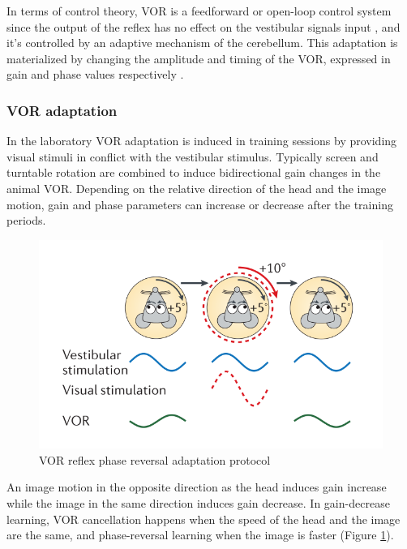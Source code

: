 \documentclass[12pt, a4paper,twoside]{tesi_upf}
\begin{document}
In terms of control theory, VOR is a feedforward or open-loop control system since the output of the reflex has no effect on the vestibular signals input \cite{Porrill2007}, and it's controlled by an adaptive mechanism of the cerebellum. This adaptation is materialized by changing the amplitude and timing of the VOR, expressed in gain and phase values respectively \cite{DeZeeuw2005}.

\subsubsection{VOR adaptation}

In the laboratory VOR adaptation is induced in training sessions by providing visual stimuli in conflict with the vestibular stimulus. Typically screen and turntable rotation are combined to induce bidirectional gain changes in the animal VOR. Depending on the relative direction of the head and the image motion, gain and phase parameters can increase or decrease after the training periods.

\begin{figure}
  \centering
  \includegraphics[scale=0.50]{images/vor_adaptation.png}
  \caption[VOR reflex phase reversal adaptation protocol]{VOR reflex phase reversal adaptation protocol \cite{Gao2012a}}
  \label{fig:voradaptation}
\end{figure}

An image motion in the opposite direction as the head induces gain increase while the image in the same direction induces gain decrease. In gain-decrease learning, VOR cancellation happens when the speed of the head and the image are the same, and phase-reversal learning when the image is faster (Figure \ref {fig:voradaptation}).
\end{document}
